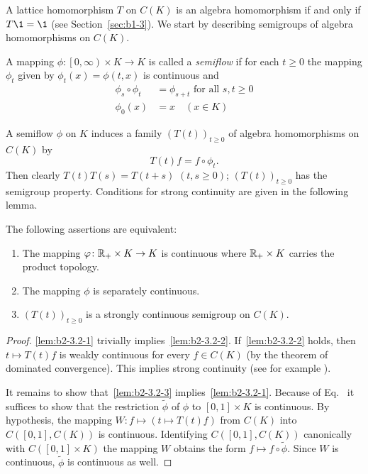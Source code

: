 A lattice homomorphism $T$ on $C(K)$ is an algebra homomorphism if and only if\/ $T \1 = \1$ (see Section~\ref{sec:b1-3}).
We start by describing semigroups of algebra homomor\-phisms on $C(K)$.
\begin{definition}\label{def:b2-3.1}
A mapping $\phi \colon \left[0,\infty\right) \times K \to K$ is called a \emph{semiflow} if for each $t \geq 0$ the mapping $\phi_{t}$ given by $\phi_{t}(x) = \phi(t,x)$ is continuous and
\begin{align}
\phi_{s} \circ \phi_{t} &= \phi_{s+t} \text{ for all } s,t \geq 0 \label{eq:b2-3.1} \\
\phi_{0}(x) &= x \quad (x \in K) \label{eq:b2-3.2}
\end{align}
\end{definition}
A semiflow $\phi$ on $K$ induces a family $(T(t))_{t \geq 0}$ of algebra homomorphisms on $C(K)$ by
\begin{equation}\label{eq:b2-3.3}
T(t)f = f \circ \phi_{t}.
\end{equation}
Then clearly $T(t)T(s) = T(t+s)$ $(t,s\geq 0)$; \ie  $(T(t))_{t \geq 0}$ has the
semigroup property.
Conditions for strong continuity are given in the following lemma.
\begin{lemma}\label{lem:b2-3.2}
The following assertions are equivalent:
\begin{enumerate}[\upshape (a)]
\item \label{lem:b2-3.2-1}
The mapping $\phi \colon \R_{+} \times K \to K$ is continuous where $\mathbb{R}_{+} \times K$ carries the product topology.
\item \label{lem:b2-3.2-2}
The mapping $\phi$ is separately continuous.
\item \label{lem:b2-3.2-3}
$(T(t))_{t \geq 0}$ is a strongly continuous semigroup on $C(K)$.
\end{enumerate}
\end{lemma}
\begin{proof}
\ref{lem:b2-3.2-1} trivially implies~\ref{lem:b2-3.2-2}.
If~\ref{lem:b2-3.2-2} holds, then $t \mapsto T(t)f$ is weakly continuous for every $f \in C(K)$ (by the theorem of dominated convergence).
This implies strong continuity (see for example \textcite[Proposition 1.23]{davies:1980}).

It remains to show that~\ref{lem:b2-3.2-3} implies~\ref{lem:b2-3.2-1}.
Because of Eq.~ it suffices to show that the restriction $\widetilde{\phi}$ of\/ $\phi$ to $[0,1] \times K$ is continuous.
By hypothesis, the mapping $W \colon f \mapsto (t \mapsto T(t)f)$ from $C(K)$ into $C([0,1],C(K))$ is continuous.
Identifying $C([0,1],C(K))$ canonically with $C([0,1] \times K)$ the mapping $W$ obtains the form $f \mapsto f \circ \widetilde{\phi}$.
Since $W$ is continuous, $\widetilde{\phi}$ is continuous as well.
\end{proof}

